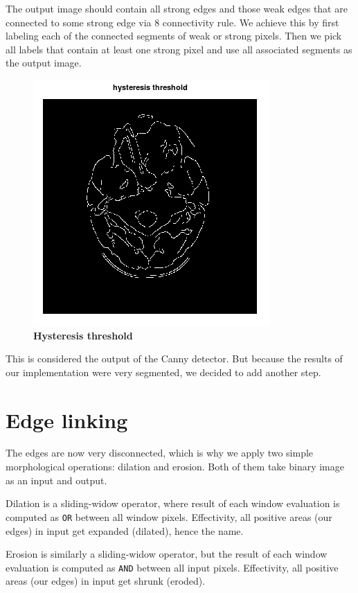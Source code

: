 \documentclass[fleqn,moreauthors,10pt]{ds_report}
\begin{document}
The output image should contain all strong edges and those weak edges that are connected to some strong edge via 8 connectivity rule. We achieve this by first labeling each of the connected segments of weak or strong pixels. Then we pick all labels that contain at least one strong pixel and use all associated segments as the output image.

\begin{figure}[h]\centering
	\includegraphics[width=0.7\linewidth]{threshold.png}
	\caption{\textbf{Hysteresis threshold}}
	\label{fig:threshold}
\end{figure}

This is considered the output of the Canny detector. But because the results of our implementation were very segmented, we decided to add another step.

\newpage

\section*{Edge linking}

The edges are now very disconnected, which is why we apply two simple morphological operations: dilation and erosion. Both of them take binary image as an input and output.

Dilation is a sliding-widow operator, where result of each window evaluation is computed as \texttt{OR} between all window pixels. Effectivity, all positive areas (our edges) in input get expanded (dilated), hence the name. 

Erosion is similarly a sliding-widow operator, but the result of each window evaluation is computed as \texttt{AND} between all input pixels. Effectivity, all positive areas (our edges) in input get shrunk (eroded). 
\end{document}
